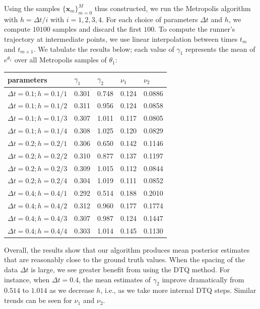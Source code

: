 \documentclass[graybox]{svmult}
\begin{document}
Using the samples $\{\mathbf{x}_m\}^M_{m=0}$ thus constructed, we run
the Metropolis algorithm with $h = \Delta t / i$ with $i = 1, 2, 3,
4$.  For each choice of parameters $\Delta t$ and $h$, we compute $10100$ samples and discard the first $100$.  To compute the runner's trajectory at intermediate points, we use
linear interpolation between times $t_m$ and $t_{m+1}$.  We tabulate
the results below; each value of $\gamma_1$ represents the mean of
$e^{\theta_1}$ over all Metropolis samples of $\theta_1$:
\setlength{\tabcolsep}{12pt}
\begin{center}
\begin{tabular}{lllll}
        parameters & $\gamma_1$ & $\gamma_2$ & $\nu_1$ & $\nu_2$ \\ \hline
 $\Delta t=0.1; h=0.1/1$  &   0.301  &   0.748 & 0.124 & 0.0886 \\ 
  $\Delta t=0.1; h=0.1/2$  &   0.311  &   0.956 & 0.124 & 0.0858\\ 
  $\Delta t=0.1; h=0.1/3$  &   0.307  &   1.011 & 0.117 & 0.0805\\
  $\Delta t=0.1; h=0.1/4$  &   0.308  &   1.025 & 0.120 & 0.0829 \\ \hline
  $\Delta t=0.2; h=0.2/1$  &   0.306  &   0.650 & 0.142 & 0.1146 \\
  $\Delta t=0.2; h=0.2/2$  &   0.310  &   0.877 & 0.137 & 0.1197 \\
  $\Delta t=0.2; h=0.2/3$  &   0.309  &   1.015 & 0.112 & 0.0844 \\
  $\Delta t=0.2; h=0.2/4$  &   0.304  &   1.019 & 0.111 & 0.0852 \\ \hline
  $\Delta t=0.4; h=0.4/1$  &   0.292  &   0.514 & 0.188 & 0.2010 \\ 
 $\Delta t=0.4; h=0.4/2$  &   0.312  &   0.960 & 0.177 & 0.1774 \\
 $\Delta t=0.4; h=0.4/3$  &   0.307  &   0.987 & 0.124 & 0.1447 \\
 $\Delta t=0.4; h=0.4/4$  &   0.303  &   1.014 & 0.145 & 0.1130
\end{tabular}
\end{center}
Overall, the results show that our algorithm produces mean posterior
estimates that are reasonably close to the ground truth values.  When
the spacing of the data $\Delta t$ is large, we see greater benefit
from using the DTQ method.  For instance, when $\Delta t = 0.4$, the
mean estimates of $\gamma_2$ improve dramatically from $0.514$ to
$1.014$ as we decrease $h$, i.e., as we take more internal DTQ steps.
Similar trends can be seen for $\nu_1$ and $\nu_2$.
\end{document}
